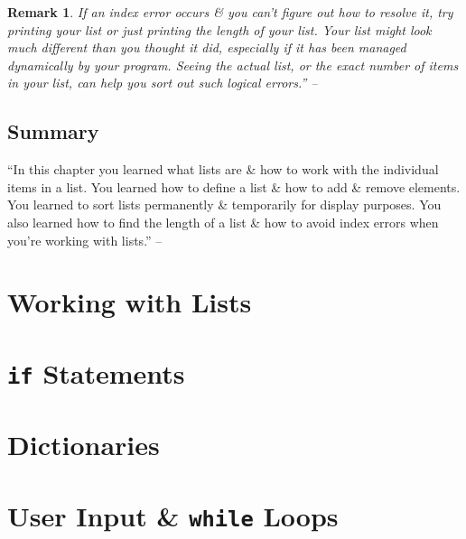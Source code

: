 \documentclass[oneside]{book}
\numberwithin{equation}{section}
\newtheorem{remark}{Remark}[chapter]
\begin{document}
\begin{remark}
	If an index error occurs \& you can't figure out how to resolve it, try printing your list or just printing the length of your list. Your list might look much different than you thought it did, especially if it has been managed dynamically by your program. Seeing the actual list, or the exact number of items in your list, can help you sort out such logical errors.'' -- \cite[pp. 46--47]{Matthes2019}
\end{remark}

\subsection{Summary}
``In this chapter you learned what lists are \& how to work with the individual items in a list. You learned how to define a list \& how to add \& remove elements. You learned to sort lists permanently \& temporarily for display purposes. You also learned how to find the length of a list \& how to avoid index errors when you're working with lists.'' -- \cite[p. 48]{Matthes2019}
 

\section{Working with Lists}


\section{\texttt{if} Statements}


\section{Dictionaries}


\section{User Input \& \texttt{while} Loops}

\end{document}
